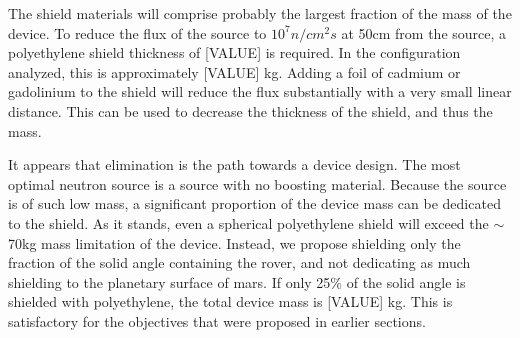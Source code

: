 \documentclass{mc2015}
\begin{document}
The shield materials will comprise probably the largest fraction of the mass of the device. To reduce the flux of the source to $10^{7} n/{{cm^2}s}$ at 50cm from the source, a polyethylene shield thickness of [VALUE] is required. In the configuration analyzed, this is approximately [VALUE] kg. Adding a foil of cadmium or gadolinium to the shield will reduce the flux substantially with a very small linear distance. This can be used to decrease the thickness of the shield, and thus the mass. 

It appears that elimination is the path towards a device design. The most optimal neutron source is a  source with no boosting material. Because the  source is of such low mass, a significant proportion of the device mass can be dedicated to the shield. As it stands, even a spherical polyethylene shield will exceed the $\sim$70kg mass limitation of the device. Instead, we propose shielding only the fraction of the  solid angle containing the rover, and not dedicating as much shielding to the planetary surface of mars. If only 25\% of the solid angle is shielded with polyethylene, the total device mass is [VALUE] kg. This is satisfactory for the objectives that were proposed in earlier sections. 
\end{document}
